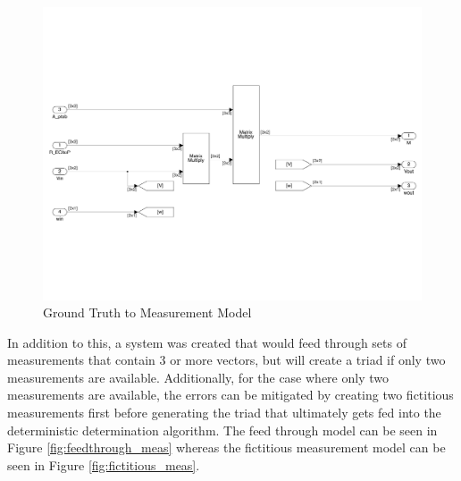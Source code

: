 \begin{figure}[H]
    \centering
    \captionsetup{ justification = centering }
    \includegraphics[trim={0.25cm 3cm 0.25cm 3cm},clip,width = 15cm]{Images/PS6/ground_truth_to_meas.png}
    \caption{Ground Truth to Measurement Model}
    \label{fig:ground_truth_to_meas}
\end{figure}

In addition to this, a system was created that would feed through sets of measurements that contain 3 or more vectors, but will create a triad if only two measurements are available. Additionally, for the case where only two measurements are available, the errors can be mitigated by creating two fictitious measurements first before generating the triad that ultimately gets fed into the deterministic determination algorithm. The feed through model can be seen in Figure \ref{fig:feedthrough_meas} whereas the fictitious measurement model can be seen in Figure \ref{fig:fictitious_meas}.

